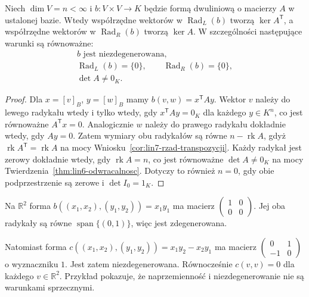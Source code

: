 \begin{twierdzenie}
\label{thm:lin8-niezdegenerowanie}
Niech \(\dim V=n<\infty\) i
\(b\colon V\times V\to K\)
będzie formą dwuliniową
o macierzy \(A\) w ustalonej bazie.
Wtedy współrzędne wektorów
w \(\operatorname{Rad}_L(b)\)
tworzą \(\ker A^{\mathsf T}\),
a współrzędne wektorów
w \(\operatorname{Rad}_R(b)\)
tworzą \(\ker A\).
W szczególności następujące
warunki są równoważne:
\[
 \begin{gathered}
 b\text{ jest niezdegenerowana},\\
 \operatorname{Rad}_L(b)=\{0\},\qquad
 \operatorname{Rad}_R(b)=\{0\},\\
 \det A\ne0_K.
 \end{gathered}
\]
\end{twierdzenie}
\begin{proof}
Dla \(x=[v]_B\), \(y=[w]_B\)
mamy \(b(v,w)=x^{\mathsf T}Ay\).
Wektor \(v\) należy do lewego
radykału wtedy i tylko wtedy, gdy
\(x^{\mathsf T}Ay=0_K\)
dla każdego \(y\in K^n\),
co jest równoważne
\(A^{\mathsf T}x=0\).
Analogicznie \(w\) należy
do prawego radykału dokładnie
wtedy, gdy \(Ay=0\).
Zatem wymiary obu radykałów
są równe \(n-\operatorname{rk}A\),
gdyż
\(\operatorname{rk}A^{\mathsf T}
=\operatorname{rk}A\)
na mocy
Wniosku~\ref{cor:lin7-rzad-transpozycji}.
Każdy radykał jest zerowy
dokładnie wtedy, gdy
\(\operatorname{rk}A=n\),
co jest równoważne
\(\det A\ne0_K\) na mocy
Twierdzenia~\ref{thm:lin6-odwracalnosc}.
Dotyczy to również \(n=0\),
gdy obie podprzestrzenie są zerowe
i \(\det I_0=1_K\).
\end{proof}

\begin{przyklad}
\label{prz:lin8-radykal}
Na \(\mathbb R^2\) forma
\(b((x_1,x_2),(y_1,y_2))
=x_1y_1\)
ma macierz
\(\begin{pmatrix}1&0\\0&0\end{pmatrix}\).
Jej oba radykały są równe
\(\operatorname{span}\{(0,1)\}\),
więc jest zdegenerowana.

Natomiast forma
\(c((x_1,x_2),(y_1,y_2))
=x_1y_2-x_2y_1\)
ma macierz
\(\begin{pmatrix}0&1\\-1&0\end{pmatrix}\)
o wyznaczniku \(1\).
Jest zatem niezdegenerowana.
Równocześnie \(c(v,v)=0\)
dla każdego \(v\in\mathbb R^2\).
Przykład pokazuje, że
naprzemienność i niezdegenerowanie
nie są warunkami sprzecznymi.
\end{przyklad}

